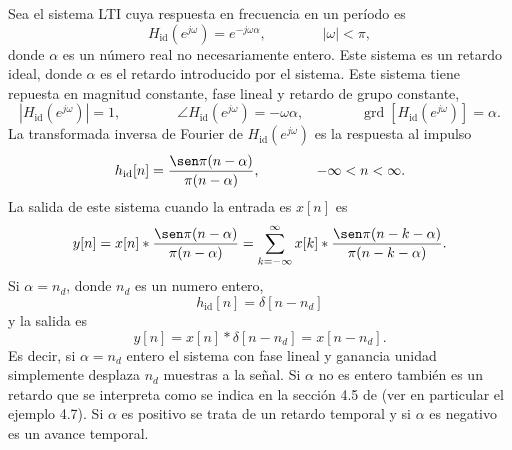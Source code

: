 \documentclass[a4paper]{report}
\DeclareMathOperator{\grd}{grd}
\begin{document}
Sea el sistema LTI cuya respuesta en frecuencia en un período es
\[
 H_\textrm{id}(e^{j\omega})=e^{-j\omega\alpha},
 \qquad\qquad 
 |\omega|<\pi,
\]
donde \(\alpha\) es un número real no necesariamente entero. Este sistema es un retardo ideal, donde \(\alpha\) es el retardo introducido por el sistema. Este sistema tiene repuesta en magnitud constante, fase lineal y retardo de grupo constante,
\[
 |H_\textrm{id}(e^{j\omega})|=1,
 \qquad\qquad 
 \angle H_\textrm{id}(e^{j\omega})=-\omega\alpha,
 \qquad\qquad
 \grd[H_\textrm{id}(e^{j\omega})]=\alpha. 
\]
La transformada inversa de Fourier de \(H_\textrm{id}(e^{j\omega})\) es la respuesta al impulso
\begin{equation}\label{eq:transform_analysis_ideal_delay_impulse_response}
 h_\textrm{id}[n]=\frac{\sen\pi(n-\alpha)}{\pi(n-\alpha)},
 \qquad\qquad 
 -\infty<n<\infty. 
\end{equation}
La salida de este sistema cuando la entrada es \(x[n]\) es
\[
 y[n]=x[n]*\frac{\sen\pi(n-\alpha)}{\pi(n-\alpha)}=\sum_{k=-\infty}^\infty x[k]*\frac{\sen\pi(n-k-\alpha)}{\pi(n-k-\alpha)}.
\]
Si \(\alpha=n_d\), donde \(n_d\) es un numero entero,
\[
 h_\textrm{id}[n]=\delta[n-n_d]
\]
y la salida es
\[
 y[n]=x[n]*\delta[n-n_d]=x[n-n_d].
\]
Es decir, si \(\alpha=n_d\) entero el sistema con fase lineal y ganancia unidad simplemente desplaza \(n_d\) muestras a la señal. Si \(\alpha\) no es  entero también es un retardo que se interpreta como se indica en la sección 4.5 de \cite{oppenheim2009discrete} (ver en particular el ejemplo 4.7). Si \(\alpha\) es positivo se trata de un retardo temporal y si \(\alpha\) es negativo es un avance temporal.
\end{document}
